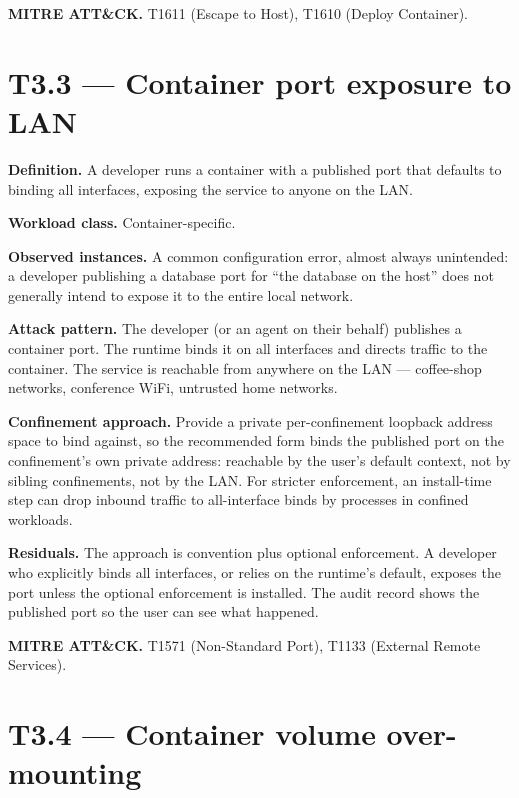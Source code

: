 \textbf{MITRE ATT\&CK.} T1611 (Escape to Host), T1610 (Deploy
Container).

\hypertarget{t3.3-container-port-exposure-to-lan}{%
\section{T3.3 --- Container port exposure to
LAN}\label{t3.3-container-port-exposure-to-lan}}

\textbf{Definition.} A developer runs a container with a published port
that defaults to binding all interfaces, exposing the service to anyone
on the LAN.

\textbf{Workload class.} Container-specific.

\textbf{Observed instances.} A common configuration error, almost always
unintended: a developer publishing a database port for ``the database on
the host'' does not generally intend to expose it to the entire local
network.

\textbf{Attack pattern.} The developer (or an agent on their behalf)
publishes a container port. The runtime binds it on all interfaces and
directs traffic to the container. The service is reachable from anywhere
on the LAN --- coffee-shop networks, conference WiFi, untrusted home
networks.

\textbf{Confinement approach.} Provide a private per-confinement
loopback address space to bind against, so the recommended form binds
the published port on the confinement's own private address: reachable
by the user's default context, not by sibling confinements, not by the
LAN. For stricter enforcement, an install-time step can drop inbound
traffic to all-interface binds by processes in confined workloads.

\textbf{Residuals.} The approach is convention plus optional
enforcement. A developer who explicitly binds all interfaces, or relies
on the runtime's default, exposes the port unless the optional
enforcement is installed. The audit record shows the published port so
the user can see what happened.

\textbf{MITRE ATT\&CK.} T1571 (Non-Standard Port), T1133 (External
Remote Services).

\hypertarget{t3.4-container-volume-over-mounting}{%
\section{T3.4 --- Container volume
over-mounting}\label{t3.4-container-volume-over-mounting}}

